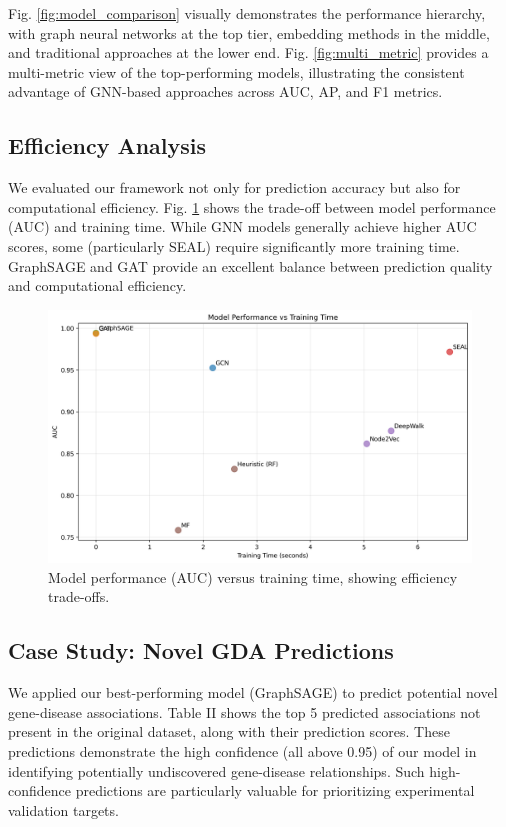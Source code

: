 \documentclass[conference]{IEEEtran}
\begin{document}
Fig. \ref{fig:model_comparison} visually demonstrates the performance hierarchy, with graph neural networks at the top tier, embedding methods in the middle, and traditional approaches at the lower end. Fig. \ref{fig:multi_metric} provides a multi-metric view of the top-performing models, illustrating the consistent advantage of GNN-based approaches across AUC, AP, and F1 metrics.



\subsection{Efficiency Analysis}
We evaluated our framework not only for prediction accuracy but also for computational efficiency. Fig. \ref{fig:time_vs_auc} shows the trade-off between model performance (AUC) and training time. While GNN models generally achieve higher AUC scores, some (particularly SEAL) require significantly more training time. GraphSAGE and GAT provide an excellent balance between prediction quality and computational efficiency.

\begin{figure}[!t]
\centering
\includegraphics[width=0.9\columnwidth]{figures/time_vs_auc.png}
\caption{Model performance (AUC) versus training time, showing efficiency trade-offs.}
\label{fig:time_vs_auc}
\end{figure}

\subsection{Case Study: Novel GDA Predictions}
We applied our best-performing model (GraphSAGE) to predict potential novel gene-disease associations. Table II shows the top 5 predicted associations not present in the original dataset, along with their prediction scores. These predictions demonstrate the high confidence (all above 0.95) of our model in identifying potentially undiscovered gene-disease relationships. Such high-confidence predictions are particularly valuable for prioritizing experimental validation targets.
\end{document}

